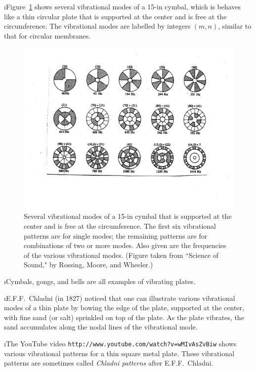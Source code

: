 \i Figure~\ref{f:plate} shows several vibrational
modes of a 15-in cymbal, which is behaves like a
thin circular plate that is supported at the center 
and is free at the circumference.
The vibrational modes are labelled by integers
$(m,n)$, similar to that for circular membranes.
%
\begin{figure}[htbp]
\begin{center}
\includegraphics[width=.9\textwidth]{plate.pdf}
\caption{
Several vibrational modes of a 15-in 
cymbal that is supported at the center and is 
free at the circumference.
The first six vibrational patterns are for 
single modes;
the remaining patterns are for combinations of
two or more modes.
Also given are the frequencies of the various
vibrational modes.
(Figure taken from ``Science of Sound," by
Rossing, Moore, and Wheeler.)}
\label{f:plate}
\end{center}
\end{figure}
%

\i Cymbals, gongs, and bells are all examples of
vibrating plates.

\i E.F.F.~Chladni (in 1827) noticed that one can
illustrate various vibrational modes of a thin 
plate by bowing the edge of the plate, 
supported at the center, with fine sand (or salt) 
sprinkled on top of the plate.
As the plate vibrates, the sand accumulates along 
the nodal lines of the vibrational mode.

\i \demo The YouTube video 
{\tt http://www.youtube.com/watch?v=wMIvAsZvBiw}
shows various vibrational patterns for a thin
square metal plate.
These vibrational patterns are sometimes called 
{\em Chladni patterns} after E.F.F.~Chladni.

